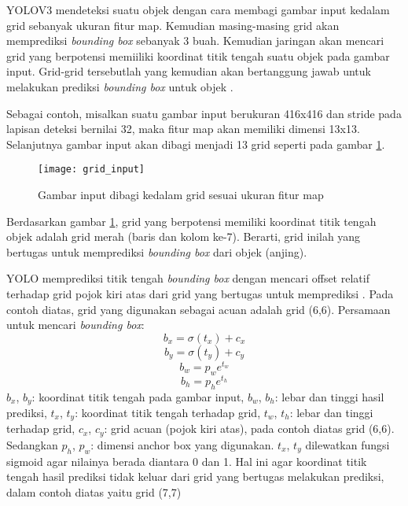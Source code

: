 \documentclass[../thesis.tex]{subfiles}
\begin{document}
YOLOV3 mendeteksi suatu objek dengan cara membagi gambar input kedalam grid sebanyak ukuran fitur map. Kemudian masing-masing grid akan memprediksi \textit{bounding box} sebanyak 3 buah.
Kemudian jaringan akan mencari grid yang berpotensi memiiliki koordinat titik tengah suatu objek pada gambar input. Grid-grid tersebutlah yang kemudian akan bertanggung jawab untuk melakukan prediksi \textit{bounding box} untuk objek \cite{YoloV3}.

Sebagai contoh, misalkan suatu gambar input berukuran 416x416 dan stride pada lapisan deteksi bernilai 32, maka fitur map akan memiliki dimensi 13x13. Selanjutnya gambar input akan dibagi menjadi 13 grid seperti pada gambar \ref{grid_YOLO}.
\begin{figure}
	\centering
	\texttt{[image: grid\_input]}
	\caption{Gambar input dibagi kedalam grid sesuai ukuran fitur map}
	\label{grid_YOLO}
\end{figure}
Berdasarkan gambar \ref{grid_YOLO}, grid yang berpotensi memiliki koordinat titik tengah objek adalah grid merah (baris dan kolom ke-7). Berarti, grid inilah yang bertugas untuk memprediksi \textit{bounding box} dari objek (anjing). 

YOLO memprediksi titik tengah \textit{bounding box} dengan mencari offset relatif terhadap grid pojok kiri atas dari grid yang bertugas untuk memprediksi \cite{YoloV2}. Pada contoh diatas, grid yang digunakan sebagai acuan adalah grid (6,6).
Persamaan untuk mencari \textit{bounding box}:
\begin{equation} \label{bx_bb}
	b_{x} = \sigma(t_{x}) + c_x
   \end{equation}
\begin{equation} \label{by_bb}
	b_{y} = \sigma(t_{y}) + c_y
\end{equation}
\begin{equation} \label{bw_bb}
	b_{w} = p_{w}e^{t_w}
\end{equation}
\begin{equation} \label{bh_bb}
	b_{h} = p_{h}e^{t_h}
\end{equation}
$b_x$, $b_y$: koordinat titik tengah pada gambar input, $b_w$, $b_h$: lebar dan tinggi hasil prediksi, $t_x$, $t_y$: koordinat titik tengah terhadap grid, $t_w$, $t_h$: lebar dan tinggi terhadap grid, $c_x$, $c_y$: grid acuan (pojok kiri atas), pada contoh diatas grid (6,6). Sedangkan $p_h$, $p_w$: dimensi anchor box yang digunakan. 
$t_x$, $t_y$ dilewatkan fungsi sigmoid agar nilainya berada diantara 0 dan 1. Hal ini agar koordinat titik tengah hasil prediksi tidak keluar dari grid yang bertugas melakukan prediksi, dalam contoh diatas yaitu grid (7,7)
\end{document}

